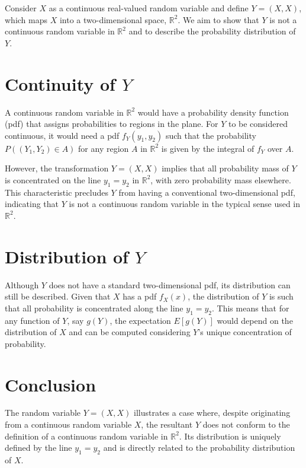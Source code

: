 \documentclass{article}
\begin{document}
Consider $X$ as a continuous real-valued random variable and define $Y = (X, X)$, which maps $X$ into a two-dimensional space, $\mathbb{R}^2$. We aim to show that $Y$ is not a continuous random variable in $\mathbb{R}^2$ and to describe the probability distribution of $Y$.

\section*{Continuity of \(Y\)}

A continuous random variable in $\mathbb{R}^2$ would have a probability density function (pdf) that assigns probabilities to regions in the plane. For $Y$ to be considered continuous, it would need a pdf $f_Y(y_1, y_2)$ such that the probability $P((Y_1, Y_2) \in A)$ for any region $A$ in $\mathbb{R}^2$ is given by the integral of $f_Y$ over $A$.

However, the transformation $Y = (X, X)$ implies that all probability mass of $Y$ is concentrated on the line $y_1 = y_2$ in $\mathbb{R}^2$, with zero probability mass elsewhere. This characteristic precludes $Y$ from having a conventional two-dimensional pdf, indicating that $Y$ is not a continuous random variable in the typical sense used in $\mathbb{R}^2$.

\section*{Distribution of \(Y\)}

Although $Y$ does not have a standard two-dimensional pdf, its distribution can still be described. Given that $X$ has a pdf $f_X(x)$, the distribution of $Y$ is such that all probability is concentrated along the line $y_1 = y_2$. This means that for any function of $Y$, say $g(Y)$, the expectation $E[g(Y)]$ would depend on the distribution of $X$ and can be computed considering $Y$'s unique concentration of probability.

\section*{Conclusion}

The random variable $Y = (X, X)$ illustrates a case where, despite originating from a continuous random variable $X$, the resultant $Y$ does not conform to the definition of a continuous random variable in $\mathbb{R}^2$. Its distribution is uniquely defined by the line $y_1 = y_2$ and is directly related to the probability distribution of $X$.
\end{document}
